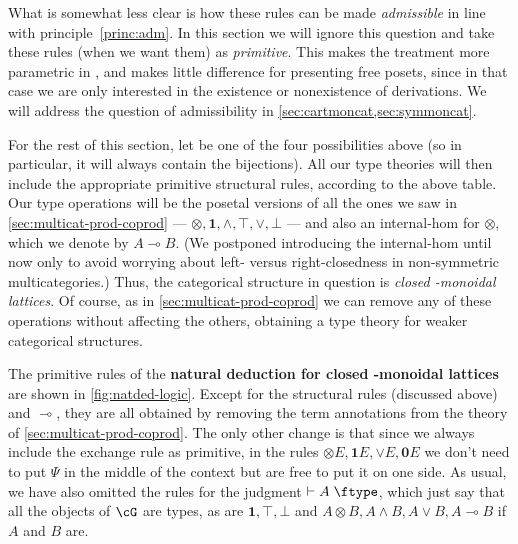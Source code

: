 \documentclass{book}
\let\types\vdash
\def\type{\;\ftype}
\let\meet\wedge
\let\join\vee
\def\joinE{\mathord{\join}E}
\def\zero{\mathbf{0}}
\def\one{\mathbf{1}}
\let\tensor\otimes
\def\tensorE{\mathord{\tensor}E}
\let\hom\multimap
\begin{document}
What is somewhat less clear is how these rules can be made \emph{admissible} in line with principle~\eqref{princ:adm}.
In this section we will ignore this question and take these rules (when we want them) as \emph{primitive}.
This makes the treatment more parametric in \fS, and makes little difference for presenting free posets, since in that case we are only interested in the existence or nonexistence of derivations.
We will address the question of admissibility in \cref{sec:cartmoncat,sec:symmoncat}.

For the rest of this section, let \fS be one of the four possibilities above (so in particular, it will always contain the bijections).
All our type theories will then include the appropriate primitive structural rules, according to the above table.
Our type operations will be the posetal versions of all the ones we saw in \cref{sec:multicat-prod-coprod} --- $\tensor,\one,\meet,\top,\join,\bot$ --- and also an internal-hom for $\tensor$, which we denote by $A\hom B$.
(We postponed introducing the internal-hom until now only to avoid worrying about left- versus right-closedness in non-symmetric multicategories.)
Thus, the categorical structure in question is \emph{closed \fS-monoidal lattices}.
Of course, as in \cref{sec:multicat-prod-coprod} we can remove any of these operations without affecting the others, obtaining a type theory for weaker categorical structures.

The primitive rules of the \textbf{natural deduction for closed \fS-monoidal lattices} are shown in \cref{fig:natded-logic}.
Except for the structural rules (discussed above) and $\hom$, they are all obtained by removing the term annotations from the theory of \cref{sec:multicat-prod-coprod}.
The only other change is that since we always include the exchange rule as primitive, in the rules $\tensorE,\one E,\joinE,\zero E$ we don't need to put $\Psi$ in the middle of the context but are free to put it on one side.
As usual, we have also omitted the rules for the judgment $\types A\type$, which just say that all the objects of $\cG$ are types, as are $\one,\top,\bot$ and $A\tensor B, A\meet B, A\join B, A\hom B$ if $A$ and $B$ are.
\end{document}
